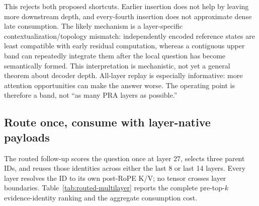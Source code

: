 \documentclass[11pt]{article}
\begin{document}
This rejects both proposed shortcuts. Earlier insertion does not help by leaving more downstream
depth, and every-fourth insertion does not approximate dense late consumption. The likely
mechanism is a layer-specific contextualization/topology mismatch: independently encoded
reference states are least compatible with early residual computation, whereas a contiguous
upper band can repeatedly integrate them after the local question has become semantically
formed. This interpretation is mechanistic, not yet a general theorem about decoder depth.
All-layer replay is especially informative: more attention opportunities can make the answer
worse. The operating point is therefore a band, not ``as many PRA layers as possible.''

\subsection{Route once, consume with layer-native payloads}

The routed follow-up scores the question once at layer 27, selects three parent IDs, and reuses
those identities across either the last 8 or last 14 layers. Every layer resolves the ID to its
own post-RoPE K/V; no tensor crosses layer boundaries. Table~\ref{tab:routed-multilayer} reports
the complete pre-top-$k$ evidence-identity ranking and the aggregate consumption cost.

\begin{table}[H]
\centering
\scriptsize
\caption{Combined route-once result over eight examples. Recall is evidence-identity recall, the
fraction of mapped evidence-parent identities recovered; $f_{80}$ and $f_{90}$ are the first
measured parent fractions reaching those levels.}
\label{tab:routed-multilayer}
\end{table}
\end{document}
